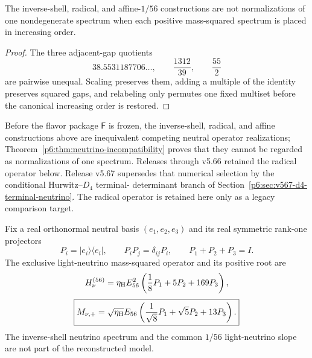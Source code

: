 \documentclass[12pt,a4paper]{article}
\newcommand{\etaH}{\eta_{\rm H}}
\begin{document}
\begin{theorem}
\label{p6:thm:neutrino-incompatibility}
The inverse-shell, radical, and affine-\(1/56\) constructions are not
normalizations of one nondegenerate spectrum when each positive
mass-squared spectrum is placed in increasing order.
\end{theorem}

\begin{proof}
The three adjacent-gap quotients
\[
38.5531187706\ldots,\qquad
\frac{1312}{39},\qquad
\frac{55}{2}
\]
are pairwise unequal.  Scaling preserves them, adding a multiple of the
identity preserves squared gaps, and relabeling only permutes one fixed
multiset before the canonical increasing order is restored.
\end{proof}

\begin{definition}
\label{p6:def:light-neutrino-realization-family}
Before the flavor package \(\mathsf F\) is frozen, the inverse-shell,
radical, and affine constructions above are inequivalent competing neutral
operator realizations; Theorem~\ref{p6:thm:neutrino-incompatibility} proves
that they cannot be regarded as normalizations of one spectrum.  Releases
through v5.66 retained the radical operator below.  Release v5.67 supersedes
that numerical selection by the conditional Hurwitz--\(D_4\) terminal-
determinant branch of Section~\ref{p6:sec:v567-d4-terminal-neutrino}.  The
radical operator is retained here only as a legacy comparison target.
\end{definition}

\begin{definition}
\label{p6:def:selected-radical-neutrino}
Fix a real orthonormal neutral basis
\((e_1,e_2,e_3)\) and its real symmetric rank-one projectors
\[
P_i=|e_i\rangle\langle e_i|,
\qquad
P_iP_j=\delta_{ij}P_i,
\qquad
P_1+P_2+P_3=I.
\]
The exclusive light-neutrino mass-squared operator and its positive root are
\begin{equation}
\label{p6:eq:selected-neutrino-square}
H_\nu^{(56)}
=
\etaH E_{56}^2
\left(\frac18P_1+5P_2+169P_3\right),
\end{equation}
\begin{equation}
\label{p6:eq:selected-positive-neutrino}
\boxed{
M_{\nu,+}
=
\sqrt{\etaH}E_{56}
\left(\frac1{\sqrt8}P_1+\sqrt5P_2+13P_3\right).
}
\end{equation}
The inverse-shell neutrino spectrum and the common \(1/56\) light-neutrino
slope are not part of the reconstructed model.
\end{definition}
\end{document}
